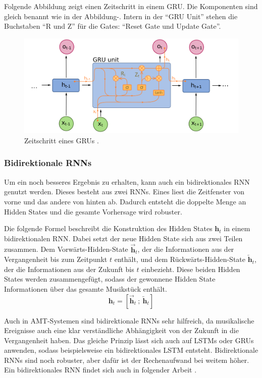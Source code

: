 Folgende Abbildung zeigt einen Zeitschritt in einem GRU.
Die Komponenten sind gleich benannt wie in der Abbildung-.
Intern in der \enquote{GRU Unit} stehen die Buchstaben \enquote{R und Z} für die Gates:
\enquote{Reset Gate und Update Gate}.
\begin{figure}[H]
    \centering
    \includegraphics[width=1\textwidth]{Graphics/GRU_timestep}
    \caption[GRU Zeitschritt]{Zeitschritt eines GRUs  \cite{wikimediaRNN}.}
    \label{fig:gru_timestep}
\end{figure}

\subsubsection{Bidirektionale RNNs}
Um ein noch besseres Ergebnis zu erhalten, kann auch ein bidirektionales RNN genutzt werden.
Dieses besteht aus zwei RNNs.
Eines liest die Zeitfenster von vorne und das andere von hinten ab.
Dadurch entsteht die doppelte Menge an Hidden States und die gesamte Vorhersage wird robuster.

Die folgende Formel beschreibt die Konstruktion des Hidden States $\mathbf{h}_t$ in einem bidirektionalen RNN.
Dabei setzt der neue Hidden State sich aus zwei Teilen zusammen.
Dem Vorwärts-Hidden-State $\overrightarrow{\mathbf{h}}_t$,
der die Informationen aus der Vergangenheit bis zum Zeitpunkt $t$ enthält,
und dem Rückwärts-Hidden-State $\overleftarrow{\mathbf{h}}_t$,
der die Informationen aus der Zukunft bis $t$ einbezieht.
Diese beiden Hidden States werden zusammengefügt,
sodass der gewonnene Hidden State Informationen über das gesamte Musikstück enthält.
\[
\mathbf{h}_t = \left[ \overrightarrow{\mathbf{h}}_t \ ;\ \overleftarrow{\mathbf{h}}_t \right]
\]

Auch in AMT-Systemen sind bidirektionale RNNs sehr hilfreich,
da musikalische Ereignisse auch eine klar verständliche Abhängigkeit von der Zukunft in die Vergangenheit haben.
Das gleiche Prinzip lässt sich auch auf LSTMs oder GRUs anwenden,
sodass beispielsweise ein bidirektionales LSTM entsteht.
Bidirektionale RNNs sind noch robuster, aber dafür ist der Rechenaufwand bei weitem höher.
Ein bidirektionales RNN findet sich auch in folgender Arbeit \cite{hawthorne2017onsets}.

